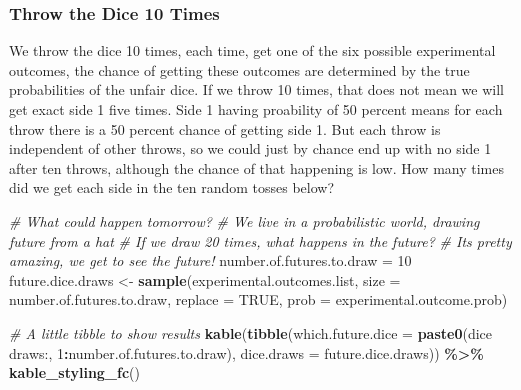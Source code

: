 \documentclass[
]{book}
\newenvironment{Shaded}{\begin{snugshade}}{\end{snugshade}}
\newcommand{\CommentTok}[1]{\textcolor[rgb]{0.56,0.35,0.01}{\textit{#1}}}
\newcommand{\DataTypeTok}[1]{\textcolor[rgb]{0.13,0.29,0.53}{#1}}
\newcommand{\DecValTok}[1]{\textcolor[rgb]{0.00,0.00,0.81}{#1}}
\newcommand{\KeywordTok}[1]{\textcolor[rgb]{0.13,0.29,0.53}{\textbf{#1}}}
\newcommand{\NormalTok}[1]{#1}
\newcommand{\OperatorTok}[1]{\textcolor[rgb]{0.81,0.36,0.00}{\textbf{#1}}}
\newcommand{\OtherTok}[1]{\textcolor[rgb]{0.56,0.35,0.01}{#1}}
\newcommand{\StringTok}[1]{\textcolor[rgb]{0.31,0.60,0.02}{#1}}
\begin{document}
\hypertarget{throw-the-dice-10-times}{%
\subsubsection{Throw the Dice 10 Times}\label{throw-the-dice-10-times}}

We throw the dice 10 times, each time, get one of the six possible experimental outcomes, the chance of getting these outcomes are determined by the true probabilities of the unfair dice. If we throw 10 times, that does not mean we will get exact side 1 five times. Side 1 having proability of 50 percent means for each throw there is a 50 percent chance of getting side 1. But each throw is independent of other throws, so we could just by chance end up with no side 1 after ten throws, although the chance of that happening is low. How many times did we get each side in the ten random tosses below?

\begin{Shaded}
\begin{Highlighting}[]
\CommentTok{\# What could happen tomorrow?}
\CommentTok{\# We live in a probabilistic world, drawing future from a hat}
\CommentTok{\# If we draw 20 times, what happens in the future?}
\CommentTok{\# It\textquotesingle{}s pretty amazing, we get to see the future!}
\NormalTok{number.of.futures.to.draw =}\StringTok{ }\DecValTok{10}
\NormalTok{future.dice.draws \textless{}{-}}\StringTok{ }\KeywordTok{sample}\NormalTok{(experimental.outcomes.list,}
                            \DataTypeTok{size =}\NormalTok{ number.of.futures.to.draw,}
                            \DataTypeTok{replace =} \OtherTok{TRUE}\NormalTok{,}
                            \DataTypeTok{prob =}\NormalTok{ experimental.outcome.prob)}

\CommentTok{\# A little tibble to show results}
\KeywordTok{kable}\NormalTok{(}\KeywordTok{tibble}\NormalTok{(}\DataTypeTok{which.future.dice =} \KeywordTok{paste0}\NormalTok{(}\StringTok{\textquotesingle{}dice draws:\textquotesingle{}}\NormalTok{, }\DecValTok{1}\OperatorTok{:}\NormalTok{number.of.futures.to.draw),}
       \DataTypeTok{dice.draws =}\NormalTok{ future.dice.draws)) }\OperatorTok{\%\textgreater{}\%}\StringTok{ }\KeywordTok{kable\_styling\_fc}\NormalTok{()}
\end{Highlighting}
\end{Shaded}
\end{document}
